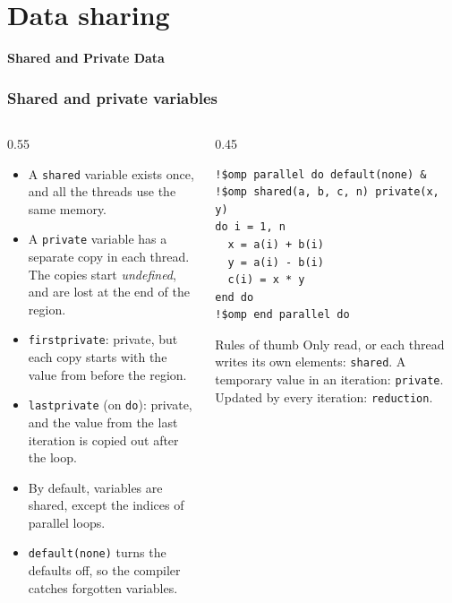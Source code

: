 \section{Data sharing}

\begin{frame}
  \centering
  \Huge \textbf{Shared and Private Data}
\end{frame}


\begin{frame}[fragile]
  \frametitle{Shared and private variables}
  \begin{columns}[T]
    \begin{column}{0.55\textwidth}
      \begin{itemize}
        \item A \texttt{shared} variable exists once, and all the threads use the same memory.
        \item A \texttt{private} variable has a separate copy in each thread. The copies start \emph{undefined}, and are lost at the end of the region.
        \item \texttt{firstprivate}: private, but each copy starts with the value from before the region.
        \item \texttt{lastprivate} (on \texttt{do}): private, and the value from the last iteration is copied out after the loop.
        \item By default, variables are shared, except the indices of parallel loops.
        \item \texttt{default(none)} turns the defaults off, so the compiler catches forgotten variables.
      \end{itemize}
    \end{column}

    \begin{column}{0.45\textwidth}
      \begin{lstlisting}
!$omp parallel do default(none) &
!$omp shared(a, b, c, n) private(x, y)
do i = 1, n
  x = a(i) + b(i)
  y = a(i) - b(i)
  c(i) = x * y
end do
!$omp end parallel do
      \end{lstlisting}

      \vspace*{1mm}
      \begin{block}{Rules of thumb}
        \small
        Only read, or each thread writes its own elements: \texttt{shared}. A temporary value in an iteration: \texttt{private}. Updated by every iteration: \texttt{reduction}.
      \end{block}
    \end{column}
  \end{columns}
\end{frame}


